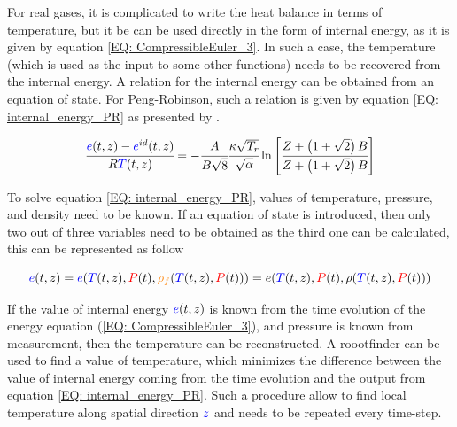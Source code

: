 \documentclass[../Article_Model_Parameters.tex]{subfiles}
\begin{document}
			For real gases, it is complicated to write the heat balance in terms of temperature, but it be can be used directly in the form of internal energy, as it is given by equation \ref{EQ: CompressibleEuler_3}. In such a case, the temperature (which is used as the input to some other functions) needs to be recovered from the internal energy. A relation for the internal energy can be obtained from an equation of state. For Peng-Robinson, such a relation is given by equation \ref{EQ: internal_energy_PR} as presented by \citet{Elliott2011}.
			
		
			{\footnotesize
				\begin{equation}
					\cfrac{{\color{blue}e}(t,z)-{\color{blue}e}^{id}(t,z)}{R{\color{blue}T}(t,z)} = - \cfrac{A}{B\sqrt{8}} \cfrac{\kappa \sqrt{T_r}}{\sqrt{\alpha}} \ln \left[ \cfrac{Z+\left( 1+\sqrt{2} \right)B}{Z+\left( 1+\sqrt{2} \right)B} \right]
					\label{EQ: internal_energy_PR}
				\end{equation}
			}
			
			To solve equation \ref{EQ: internal_energy_PR}, values of temperature, pressure, and density need to be known. If an equation of state is introduced, then only two out of three variables need to be obtained as the third one can be calculated, this can be represented as follow
			
			{\footnotesize
			\begin{equation}
				{\color{blue}e}(t,z)={\color{blue}e}({\color{blue}T}(t,z),{\color{red}P}(t),{\color{orange}\rho_f}({\color{blue}T}(t,z),{\color{red}P}(t)))=e( {\color{blue}T}(t,z),{\color{red}P}(t), \rho({\color{blue}T}(t,z),{\color{red}P}(t)) ) 
			\end{equation}
			}
		
			If the value of internal energy ${\color{blue}e}(t,z)$ is known from the time evolution of the energy equation (\ref{EQ: CompressibleEuler_3}), and pressure is known from measurement, then the temperature can be reconstructed. A roootfinder can be used to find a value of temperature, which minimizes the difference between the value of internal energy coming from the time evolution and the output from equation \ref{EQ: internal_energy_PR}. Such a procedure allow to find local temperature along spatial direction ${\color{blue}z}$ and needs to be repeated every time-step.
			
\end{document}
